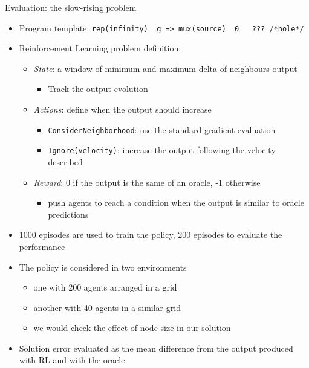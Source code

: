 \documentclass[8pt, aspectratio=169, handout]{beamer}
\begin{document}
\begin{frame}{Evaluation: the slow-rising problem}
\begin{card}
\begin{itemize}
      \item Program template: \texttt{rep(infinity) { g => mux(source) { 0 } { ??? /*hole*/ } }}
      \item Reinforcement Learning problem definition:
      \begin{itemize}
        \item \emph{State}: a window of minimum and maximum delta of neighbours output
        \begin{itemize}
          \item[\faArrowRight] Track the output evolution
        \end{itemize}
        \item \emph{Actions}: define when the output should increase
        \begin{itemize}
          \item[\faArrowRight] \texttt{ConsiderNeighborhood}: use the standard gradient evaluation
          \item[\faArrowRight] \texttt{Ignore(velocity)}: increase the output following the velocity described
        \end{itemize}
        \item \emph{Reward}: 0 if the output is the same of an oracle, -1 otherwise
        \begin{itemize}
          \item[\faArrowRight] push agents to reach a condition when the output is similar to oracle predictions
        \end{itemize}
      \end{itemize}
    \end{itemize}
  \end{card}
\framebreak
  \begin{card}
    \begin{itemize}
      \item 1000 episodes are used to train the policy, 200 episodes to evaluate the performance
      \item The policy is considered in two environments 
      \begin{itemize}
        \item one with 200 agents arranged in a grid
        \item another with 40 agents in a similar grid
        \item we would check the effect of node size in our solution
      \end{itemize}
      \item Solution error evaluated as the mean difference from the output produced with RL and with the oracle

\end{itemize}
\end{card}
\end{frame}
\end{document}
